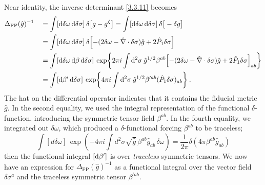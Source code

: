 Near identity, the inverse determinant \eqref{3.3.11} becomes    
\begin{align}
	\Delta_{\mathrm{FP}}(\hat{g})^{-1}	&\quad =\int[\mathrm{d} \delta \omega \, \mathrm{d} \delta \sigma]\: \delta\bigl[g-g^{\zeta}\bigr]=\int[\mathrm{d} \delta \omega \, \mathrm{d} \delta \sigma]\: \delta\big[-\delta g\big] \nonumber \\	
	&\quad =\int[\mathrm{d} \delta \omega \, \mathrm{d} \delta \sigma]\: \delta\Bigl[-(2 \delta \omega-\hat{\nabla} \cdot \delta \sigma) \hat{g}+2 \hat{P}_{1} \delta \sigma\Bigr] \nonumber \\
	&\quad =\int[\mathrm{d} \delta \omega \, \mathrm{d} \beta\, \mathrm{d} \delta \sigma] \: \exp \biggl\{2 \pi i \int \mathrm{d}^{2} \sigma \: \hat{g}^{1 / 2} \beta^{a b}
	\Bigl[-(2 \delta \omega-\hat{\nabla} \cdot \delta \sigma) \hat{g}+2 \hat{P}_{1} \delta \sigma\Bigr]_{a b}\biggr\} \nonumber \\
	&\quad =\int[\mathrm{d} \beta^{\prime}\, \mathrm{d} \delta \sigma]\: \exp \biggl\{4 \pi i \int \mathrm{d}^{2} \sigma \: \hat{g}^{1 / 2} \beta^{\prime a b}
	(\hat{P}_{1} \delta \sigma)_{a b}\biggr\} \:.
	\label{3.3.18}
\end{align}
The hat on the differential operator indicates that it contains the fiducial metric $\hat{g}$. In the second equality, we used the integral representation of the functional $\delta$-function, introducing the symmetric tensor field $\beta^{a b} $. 
In the fourth equality, we integrated out $\delta \omega$, which produced a $\delta$-functional forcing $\beta^{a b}$ to be traceless; 
\begin{equation}
	\int [d\delta\omega]\,
	\exp\left(
	-4\pi i \int d^2\sigma \sqrt{\hat g}\, \beta^{ab} \hat g_{ab}\, \delta\omega
	\right)
	= \frac{1}{2\pi} \delta\!\left(4\pi \beta^{ab} \hat g_{ab}\right)
	\tag{3.34}
\end{equation}
then the functional integral $[\mathrm{d} \beta^{\prime}]$ is over \emph{traceless} symmetric tensors.    
We now have an expression for $\Delta_{\mathrm{FP}}(\hat{g})^{-1}$ as a functional integral over the vector field $\delta \sigma^{a}$ and the traceless symmetric tensor $\beta^{\prime a b}$.    

